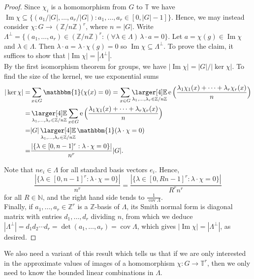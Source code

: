 \documentclass[a4paper,11pt]{article}
\numberwithin{theorem}{section}
\theoremstyle{definition}
\newcommand\id{\mathbbm{1}}
\newcommand{\on}[1]{
	\operatorname{#1}
}
\newcommand{\exx}{
  \mathop{
    \mathchoice{\vcenter{\hbox{\larger[4]$\mathbb{E}$}}}
               {\kern0pt\mathbb{E}}
               {\kern0pt\mathbb{E}}
               {\kern0pt\mathbb{E}}
  }\displaylimits
}
\begin{document}
\begin{proof}
    Since $\chi_i$ is a homomorphism from $G$ to $\mathbb{T}$ we have $\on{Im} \chi \subseteq \{(a_1/|G|, \dots, a_r / |G|) : a_1, \dots, a_r \in [0, |G|-1]\}$. Hence, we may instead consider $\chi : G \to (\mathbb{Z}/n\mathbb{Z})^r$, where $n = |G|$. Write $\Lambda^\perp = \{(a_1, \dots, a_r) \in (\mathbb{Z}/n\mathbb{Z})^r : (\forall \lambda \in \Lambda)\,\lambda \cdot a = 0\}$. Let $a = \chi(g) \in \on{Im} \chi$ and $\lambda \in \Lambda$. Then $\lambda \cdot a = \lambda \cdot \chi(g) = 0$ so $\on{Im}\chi \subseteq \Lambda^\perp$. To prove the claim, it suffices to show that $|\on{Im}\chi| = |\Lambda^\perp|$.\\
    \indent By the first isomorphism theorem for groups, we have $|\on{Im}\chi| = |G| / |\on{ker} \chi|$. To find the size of the kernel, we use exponential sums
    \begin{align*}|\on{ker} \chi| = &\sum_{x \in G} \id(\chi(x) = 0) = \sum_{x \in G} \exx_{\lambda_1, \dots, \lambda_r \in \mathbb{Z}/n\mathbb{Z}}\on{e}\Big(\frac{\lambda_1 \chi_1(x) + \dots + \lambda_r \chi_r(x)}{n}\Big)\\
    = & \exx_{\lambda_1, \dots, \lambda_r \in \mathbb{Z}/n\mathbb{Z}} \sum_{x \in G} \on{e}\Big(\frac{\lambda_1 \chi_1(x) + \dots + \lambda_r \chi_r(x)}{n}\Big)\\
    = & |G| \exx_{\lambda_1, \dots, \lambda_r \in \mathbb{Z}/n\mathbb{Z}} \id(\lambda \cdot \chi = 0)\\
    = & \frac{|\{ \lambda \in [0, n-1]^r : \lambda \cdot \chi = 0\}|}{n^r} |G|.
    \end{align*}

Note that $n e_i \in \Lambda$ for all standard basis vectors $e_i$. Hence, 
\[\frac{|\{ \lambda \in [0, n-1]^r : \lambda \cdot \chi = 0\}|}{n^r} = \frac{|\{ \lambda \in [0, Rn-1]^r : \lambda \cdot \chi = 0\}|}{R^r n^r}\]
for all $R \in \mathbb{N}$, and the right hand side tends to $\frac{1}{\on{cov} \Lambda}$.\\
\indent Finally, if $a_1, \dots, a_r \in \mathbb{Z}^r$ is a $\mathbb{Z}$-basis of $\Lambda$, its Smith normal form is diagonal matrix with entries $d_1, \dots, d_r$ dividing $n$, from which we deduce $|\Lambda^\perp| = d_1 d_2 \cdots d_r = \det (a_1, \dots, a_r) = \on{cov} \Lambda$, which gives $|\on{Im} \chi| = |\Lambda^\perp|$, as desired.\end{proof}

\vspace{\baselineskip}
We also need a variant of this result which tells us that if we are only interested in the approximate values of images of a homomorphism $\chi : G \to \mathbb{T}^r$, then we only need to know the bounded linear combinations in $\Lambda$.
\end{document}
